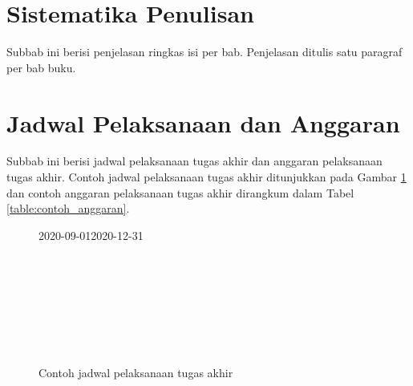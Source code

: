 \section{Sistematika Penulisan}

Subbab ini berisi penjelasan ringkas isi per bab. Penjelasan ditulis satu paragraf per bab buku.

\section{Jadwal Pelaksanaan dan Anggaran}

Subbab ini berisi jadwal pelaksanaan tugas akhir dan anggaran pelaksanaan tugas akhir. Contoh jadwal pelaksanaan tugas akhir ditunjukkan pada Gambar \ref{figure:contoh_jadwal_pelaksanaan} dan contoh anggaran pelaksanaan tugas akhir dirangkum dalam Tabel \ref{table:contoh_anggaran}.

\begin{figure}[h]
	\small
	\centering
	\begin{ganttchart}[
		hgrid,
		vgrid,
		y unit chart=0.5cm,
		y unit title=0.6cm,
		title height=1,
		x unit=1mm,
		time slot format=isodate,
		time slot unit=day]{2020-09-01}{2020-12-31}
		 \\
		 \\
		 \\
		 \\
		 \\
		 \\
		 \\
		 \\
	\end{ganttchart}
	\caption{Contoh jadwal pelaksanaan tugas akhir}
	\label{figure:contoh_jadwal_pelaksanaan}
\end{figure}


